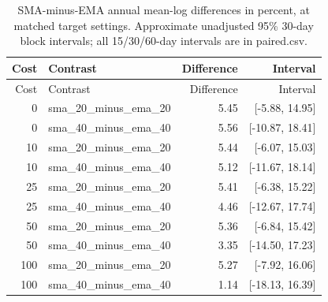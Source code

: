 \begin{longtable}{rlrr}
\caption{SMA-minus-EMA annual mean-log differences in percent, at matched target settings. Approximate unadjusted 95\% 30-day block intervals; all 15/30/60-day intervals are in paired.csv.}\label{tab:botextensionpaired}\\
\toprule Cost & Contrast & Difference & Interval \\
\midrule\endfirsthead
\toprule Cost & Contrast & Difference & Interval \\
\midrule\endhead
0 & sma\_20\_minus\_ema\_20 & 5.45 & [-5.88, 14.95] \\
0 & sma\_40\_minus\_ema\_40 & 5.56 & [-10.87, 18.41] \\
10 & sma\_20\_minus\_ema\_20 & 5.44 & [-6.07, 15.03] \\
10 & sma\_40\_minus\_ema\_40 & 5.12 & [-11.67, 18.14] \\
25 & sma\_20\_minus\_ema\_20 & 5.41 & [-6.38, 15.22] \\
25 & sma\_40\_minus\_ema\_40 & 4.46 & [-12.67, 17.74] \\
50 & sma\_20\_minus\_ema\_20 & 5.36 & [-6.84, 15.42] \\
50 & sma\_40\_minus\_ema\_40 & 3.35 & [-14.50, 17.23] \\
100 & sma\_20\_minus\_ema\_20 & 5.27 & [-7.92, 16.06] \\
100 & sma\_40\_minus\_ema\_40 & 1.14 & [-18.13, 16.39] \\
\bottomrule\end{longtable}
